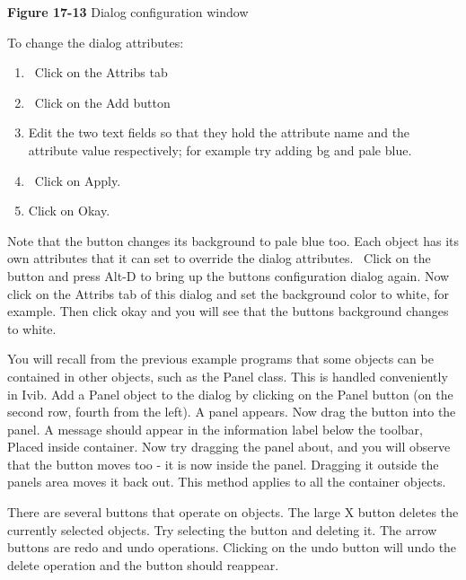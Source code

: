 {\sffamily\bfseries Figure 17-13}
{\sffamily Dialog configuration window}

\bigskip

To change the dialog attributes:

\begin{enumerate}
\item \ Click on the Attribs tab

\item \ Click on the Add button


\item Edit the two text fields so that they hold the attribute name and
the attribute value respectively; for example try adding
{\textquotedbl}bg{\textquotedbl} and {\textquotedbl}pale
blue{\textquotedbl}.
\item \ Click on Apply.

\item Click on Okay.
\end{enumerate}

\bigskip

Note that the button changes its background to pale blue too. Each
object has its own attributes that it can set to override the dialog
attributes. \ Click on the button and press Alt-D to bring up the
button{\textquotesingle}s configuration dialog again. Now click on the
Attribs tab of this dialog and set the background color to white, for
example. Then click okay and you will see that the
button{\textquotesingle}s background changes to white.

You will recall from the previous example programs that some objects can
be contained in other objects, such as the \textsf{Panel} class. This
is handled conveniently in Ivib. Add a \textsf{Panel} object to the
dialog by clicking on the \textsf{Panel} button (on the second row,
fourth from the left). A panel appears. Now drag the button into the
panel. A message should appear in the information label below the
toolbar, {\textquotedbl}Placed inside container.{\textquotedbl} Now try
dragging the panel about, and you will observe that the button moves
too - it is now {\textquotedbl}inside{\textquotedbl} the panel.
Dragging it outside the panel{\textquotesingle}s area moves it back
out. This method applies to all the container objects.

There are several buttons that operate on objects. The large
{\textquotedbl}X{\textquotedbl} button deletes the currently selected
objects. Try selecting the button and deleting it. The arrow buttons
are {\textquotedbl}redo{\textquotedbl} and
{\textquotedbl}undo{\textquotedbl} operations. Clicking on the undo
button will undo the delete operation and the button should reappear.

